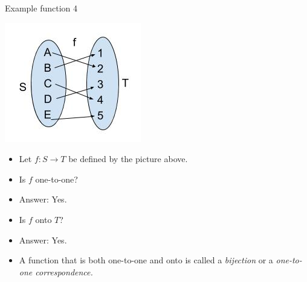 \documentclass{beamer}
\begin{document}
\begin{frame}{Example function 4}
\begin{center}
\includegraphics[scale=0.25]{function4}
\end{center}

\begin{itemize}
\item Let $f:S\to T$ be defined by the picture above.
\item Is $f$ one-to-one?
\item Answer: Yes.
\item Is $f$ onto $T$?
\item Answer: Yes.
\item A function that is both one-to-one and onto is called a \emph{bijection}
or a \emph{one-to-one correspondence.}
\end{itemize}
\end{frame}
\end{document}
